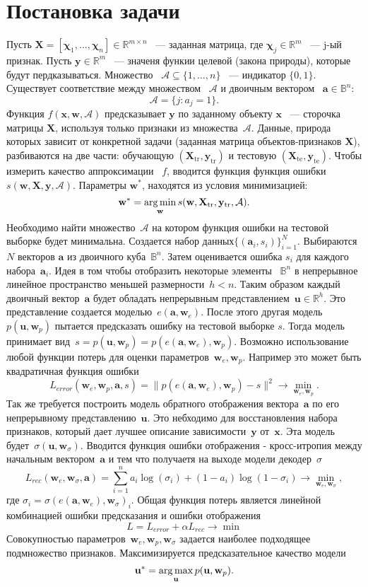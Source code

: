 \documentclass[12pt,twoside]{article}
\newcommand{\bX}{\mathbf{X}}
\newcommand{\ba}{\mathbf{a}}
\newcommand{\bx}{\mathbf{x}}
\newcommand{\by}{\mathbf{y}}
\newcommand{\bu}{\mathbf{u}}
\newcommand{\bw}{\mathbf{w}}
\newcommand{\cA}{\mathcal{A}}
\newcommand{\bbB}{\mathbb{B}}
\newcommand{\bbR}{\mathbb{R}}
\begin{document}
\section{Постановка задачи}
Пусть $\mathbf{X}=[\boldsymbol{\chi}_1,...,\boldsymbol{\chi}_n]\in\mathbb{R}^{m\times n}$ ~--- заданная матрица, где $\boldsymbol{\chi}_j\in\mathbb{R}^m$ ~--- j-ый признак. Пусть  $\by \in \bbR^m$ ~--- значеня функии целевой (закона природы), которые будут пердказываться. Множество ~$\cA \subseteq \{1, \dots, n\}$ ~--- индикатор $\{0,1\}$. Существует соответствие между множеством ~$\cA$ и двоичным вектором ~$\ba \in \bbB^n$:
\[
	\cA = \{j: a_j = 1\}.
\]
Функция  $f(\bx, \bw, \cA)$ предсказывает $\by$ по заданному объекту $\bx$ ~--- сторочка матрицы $\mathbf{X}$, используя только признаки из множества~$\cA$. Данные, природа которых зависит от конкретной задачи (заданная матрица объектов-признаков $\mathbf{X}$), разбиваются на две части: обучающую $(\bX_{\text{tr}}, \by_{\text{tr}})$ и тестовую $(\bX_{\text{te}}, \by_{\text{te}})$. Чтобы измерить качество аппроксимации ~$f$, вводится функция функция ошибки~$s(\bw, \bX, \by, \cA)$. Параметры $\bw^*$, находятся из условия минимизацией:
\[
	\bw^* = \argmin_{\bw} s(\bw, \bX_{\text{tr}}, \by_{\text{tr}}, \cA).
\]
 Необходимо найти множество~$\cA$ на котором функция ошибки на тестовой выборке будет минимальна. Создается набор данных$\{(\ba_i, s_i)\}_{i=1}^N$. Выбираются $N$ векторов $\ba$ из двоичного куба~$\bbB^n$. Затем оценивается ошибка $s_i$ для каждого набора~$\ba_i$. Идея в том чтобы отобразить некоторые элементы ~$\bbB^n$ в непрерывное линейное пространство  меньшей размерности~$h <n$. Таким образом каждый двоичный вектор~$\ba$ будет обладать непрерывным представлением~$\bu \in \bbR^h$. Это представление создается моделью~$e(\ba, \bw_e)$. После этого другая модель~$p(\bu, \bw_p)$ пытается предсказать ошибку на тестовой  выборке $s$. Тогда модель принимает вид~$s=p(\bu, \bw_p) = p(e(\ba, \bw_e), \bw_p)$. Возможно использование любой функции потерь для оценки параметров~$\bw_e, \bw_p$. Например это может быть квадратичная функция ошибки
 \[
	L_{error}(\bw_e, \bw_p, \ba, s) = \| p(e(\ba, \bw_e), \bw_p) - s \| ^2 \rightarrow \min_{\bw_e, \bw_p}.
\]
Так же требуется построить модель обратного отображения вектора~$\ba$ по его непрерывному представлению~$\bu$. Это небходимо для восстановления набора признаков, который дает лучшее описание зависимости~$\by$ от~$\bx$. Эта модель будет~$\sigma(\bu, \bw_{\sigma})$. Вводится функция ошибки отображения - кросс-итропия между начальным вектором~$\ba$ и тем что получаетя на выходе модели декодер~$\sigma$
\[
	L_{rec}(\bw_e, \bw_\sigma, \ba) = \sum_{i=1}^n a_i \log(\sigma_i) + (1 - a_i) \log (1 - \sigma_i) \rightarrow \min_{\bw_e, \bw_\sigma},
\]
где $\sigma_i = \sigma(e(\ba, \bw_e), \bw_{\sigma})_i$.
Общая функция потерь является линейной комбинацией ошибки предсказания и ошибки отображения
\[
	L = L_{error} + \alpha L_{rec}\rightarrow \min 
\]
Совокупностью параметров~$\bw_e, \bw_p, \bw_\sigma$ задается наиболее подходящее подмножество признаков. Максимизируется предсказательное качество модели
\[
	\bu^* = \argmax_{\bu} p(\bu, \bw_p).
\]
\end{document}
